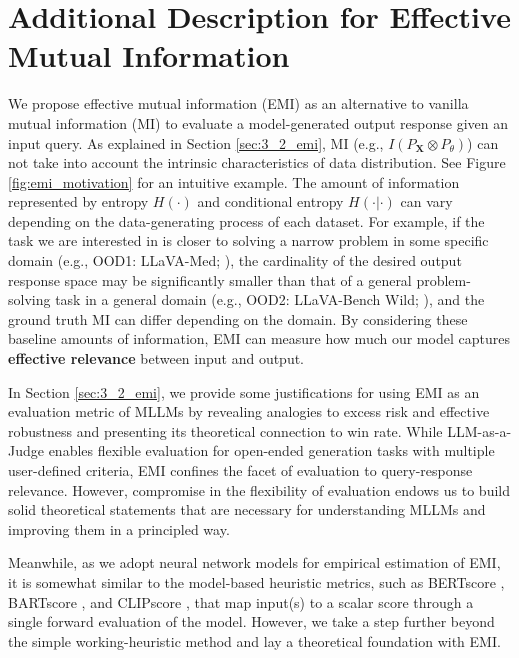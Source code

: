 \section{Additional Description for Effective Mutual Information}\label{appendix:emi}
We propose effective mutual information (EMI) as an alternative to vanilla mutual information (MI) to evaluate a model-generated output response given an input query. As explained in Section \ref{sec:3_2_emi}, MI (e.g., $I(P_{\mathbf{X}}\otimes P_{\theta})$) can not take into account the intrinsic characteristics of data distribution. See Figure \ref{fig:emi_motivation} for an intuitive example. The amount of information represented by entropy $H(\cdot)$ and conditional entropy $H(\cdot|\cdot)$ can vary depending on the data-generating process of each dataset. For example, if the task we are interested in is closer to solving a narrow problem in some specific domain (e.g., OOD1: LLaVA-Med; \citet{li2024llava}), the cardinality of the desired output response space may be significantly smaller than that of a general problem-solving task in a general domain (e.g., OOD2: LLaVA-Bench Wild; \citet{liu2023visual}), and the ground truth MI can differ depending on the domain. By considering these baseline amounts of information, EMI can measure how much our model captures \textbf{effective relevance} between input and output.

In Section \ref{sec:3_2_emi}, we provide some justifications for using EMI as an evaluation metric of MLLMs by revealing analogies to excess risk and effective robustness and presenting its theoretical connection to win rate. While LLM-as-a-Judge enables flexible evaluation for open-ended generation tasks with multiple user-defined criteria, EMI confines the facet of evaluation to query-response relevance. However, compromise in the flexibility of evaluation endows us to build solid theoretical statements that are necessary for understanding MLLMs and improving them in a principled way.



Meanwhile, as we adopt neural network models for empirical estimation of EMI, it is somewhat similar to the model-based heuristic metrics, such as BERTscore \cite{zhang2020bertscore}, BARTscore \cite{yuan2021bartscore}, and CLIPscore \cite{hessel2021clipscore}, that map input(s) to a scalar score through a single forward evaluation of the model. However, we take a step further beyond the simple working-heuristic method and lay a theoretical foundation with EMI.

